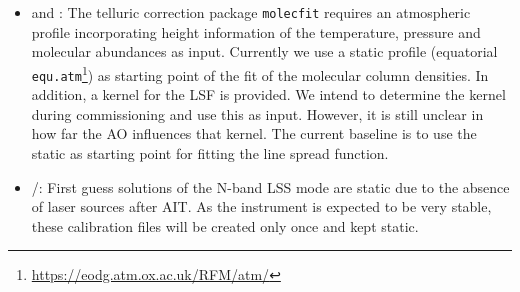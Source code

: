 \begin{itemize}
    \item \hyperref[dataitem:atm_profile]{} and \hyperref[dataitem:lsf_kernel]{}: The telluric correction package \texttt{molecfit} requires an atmospheric profile incorporating height information of the temperature, pressure and molecular abundances as input. Currently we use a static profile (equatorial \texttt{equ.atm}\footnote{\url{https://eodg.atm.ox.ac.uk/RFM/atm/}}) as starting point of the fit of the molecular column densities. In addition, a kernel for the \ac{LSF} is provided. We intend to determine the kernel during commissioning and use this as input. However, it is still unclear in how far the \ac{AO} influences that kernel. The current baseline is to use the static \hyperref[dataitem:lsf_kernel]{} as starting point for fitting the line spread function.
    \item \hyperref[dataitem:n_lss_dist_sol]{}/\hyperref[dataitem:n_lss_wave_guess]{}: First guess solutions of the N-band LSS mode are static due to the absence of laser sources after \ac{AIT}. As the instrument is expected to be very stable, these calibration files will be created only once and kept static.
\end{itemize}
